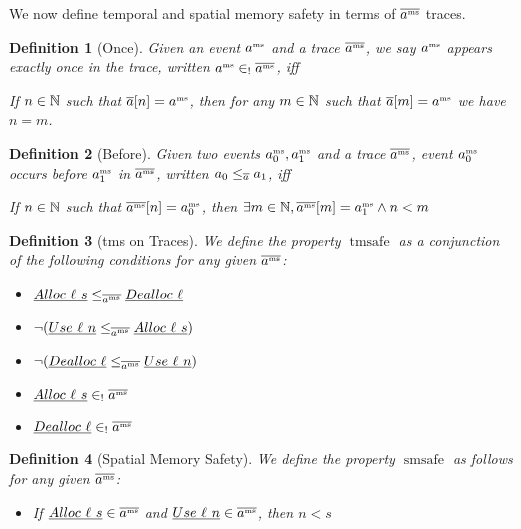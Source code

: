 \documentclass[a4paper,names,dvipsnames]{article}
\newtheorem{definition}{Definition}
\begin{document}
We now define temporal and spatial memory safety in terms of $\mstrace$ traces.

\begin{definition}[Once]
  Given an event $\msevent$ and a trace $\mstrace$, we say $\msevent$ appears exactly once in the trace, written $\msevent\in_{!}\mstrace$, iff

  If $n\in\nat$ such that $\trace{[n]}=\msevent$, then for any $m\in\nat$ such that $\trace{[m]}=\msevent$ we have $n = m$.
\end{definition}

\begin{definition}[Before]
  Given two events $\msevent[_0],\msevent[_1]$ and a trace $\mstrace$, event $\msevent[_0]$ occurs before $\msevent[_1]$ in $\mstrace$, written
  $\event{_0}\le_{\trace}\event{_1}$, iff

  If $n\in\nat$ such that $\mstrace{[n]} = \msevent[_{0}]$, then $\exists m\in\nat, \mstrace{[m]} = \msevent[_1] \wedge n< m$
\end{definition}

\begin{definition}[\gls{tms} on Traces]\label{def:tempmemsafe}
  We define the property $\operatorname{tmsafe}$ as a conjunction of the following conditions for any given $\mstrace$:
  \begin{itemize}
    \item $\specificev{Alloc\ \loc\ s}\le_{{\mstrace}}\specificev{Dealloc\ \loc}$
    \item $\neg(\specificev{Use\ \loc\ n}\le_{{\mstrace}}\specificev{Alloc\ \loc\ s})$
    \item $\neg(\specificev{Dealloc\ \loc}\le_{{\mstrace}}\specificev{Use\ \loc\ n})$
    \item $\specificev{Alloc\ \loc\ s}\in_{!}\mstrace$
    \item $\specificev{Dealloc\ \loc}\in_{!}\mstrace$
  \end{itemize}
\end{definition}

\begin{definition}[Spatial Memory Safety]\label{def:spatmemsafe}
  We define the property $\operatorname{smsafe}$ as follows for any given $\mstrace$:
  \begin{itemize}
    \item If $\specificev{Alloc\ \loc\ s}\in{\mstrace}$ and $\specificev{Use\ \loc\ n}\in{\mstrace}$, then ${n}<{s}$
  \end{itemize}
\end{definition}
\end{document}
